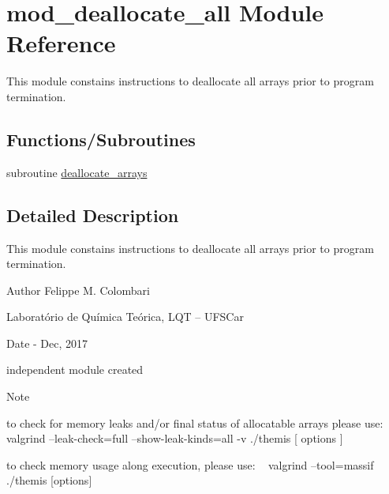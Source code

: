 \hypertarget{namespacemod__deallocate__all}{}\section{mod\+\_\+deallocate\+\_\+all Module Reference}
\label{namespacemod__deallocate__all}


This module constains instructions to deallocate all arrays prior to program termination.  


\subsection*{Functions/\+Subroutines}
\begin{DoxyCompactItemize}
\item 
subroutine \hyperlink{namespacemod__deallocate__all_a741dd6416e52cb83db723ea15d7c7dd9}{deallocate\+\_\+arrays}
\end{DoxyCompactItemize}


\subsection{Detailed Description}
This module constains instructions to deallocate all arrays prior to program termination. 

\begin{DoxyAuthor}{Author}
Felippe M. Colombari
\begin{DoxyItemize}
\item Laboratório de Química Teórica, L\+QT -- U\+F\+S\+Car 
\end{DoxyItemize}
\end{DoxyAuthor}
\begin{DoxyDate}{Date}
-\/ Dec, 2017
\begin{DoxyItemize}
\item independent module created 
\end{DoxyItemize}
\end{DoxyDate}
\begin{DoxyNote}{Note}

\begin{DoxyItemize}
\item to check for memory leaks and/or final status of allocatable arrays please use\+: ~\newline
 valgrind --leak-\/check=full --show-\/leak-\/kinds=all -\/v ./themis \mbox{[} options \mbox{]}
\item to check memory usage along execution, please use\+: ~\newline
 valgrind --tool=massif ./themis \mbox{[}options\mbox{]} 
\end{DoxyItemize}
\end{DoxyNote}


